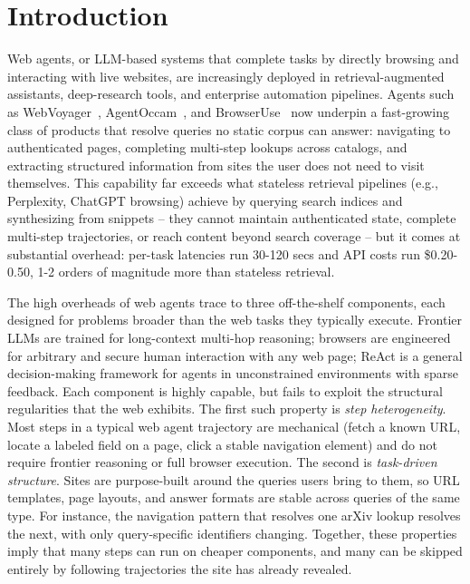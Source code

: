 \section{Introduction}

\begin{sloppypar}
Web agents, or LLM-based systems that complete tasks by directly browsing and interacting with live websites, are increasingly deployed in retrieval-augmented assistants, deep-research tools, and enterprise automation pipelines. Agents such as WebVoyager~\cite{webvoyager}, AgentOccam~\cite{agentoccam}, and BrowserUse~\cite{browseruse} now underpin a fast-growing class of products that resolve queries no static corpus can answer: navigating to authenticated pages, completing multi-step lookups across catalogs, and extracting structured information from sites the user does not need to visit themselves. This capability far exceeds what stateless retrieval pipelines (e.g., Perplexity, ChatGPT browsing) achieve by querying search indices and synthesizing from snippets -- they cannot maintain authenticated state, complete multi-step trajectories, or reach content beyond search coverage -- but it comes at substantial overhead: per-task latencies run 30-120 secs and API costs run \$0.20-0.50, 1-2 orders of magnitude more than stateless retrieval. %
\end{sloppypar}

The high overheads of web agents trace to three off-the-shelf components, each designed for problems broader than the web tasks they typically execute. Frontier LLMs are trained for long-context multi-hop reasoning; browsers are engineered for arbitrary and secure human interaction with any web page; ReAct is a general decision-making framework for agents in unconstrained environments with sparse feedback. Each component is highly capable, but fails to exploit the structural regularities that the web exhibits. The first such property is \emph{step heterogeneity}. Most steps in a typical web agent trajectory are mechanical (fetch a known URL, locate a labeled field on a page, click a stable navigation element) and do not require frontier reasoning or full browser execution. The second is \emph{task-driven structure}. Sites are purpose-built around the queries users bring to them, so URL templates, page layouts, and answer formats are stable across queries of the same type. For instance, the navigation pattern that resolves one arXiv lookup resolves the next, with only query-specific identifiers changing. Together, these properties imply that many steps can run on cheaper components, and many can be skipped entirely by following trajectories the site has already revealed.

